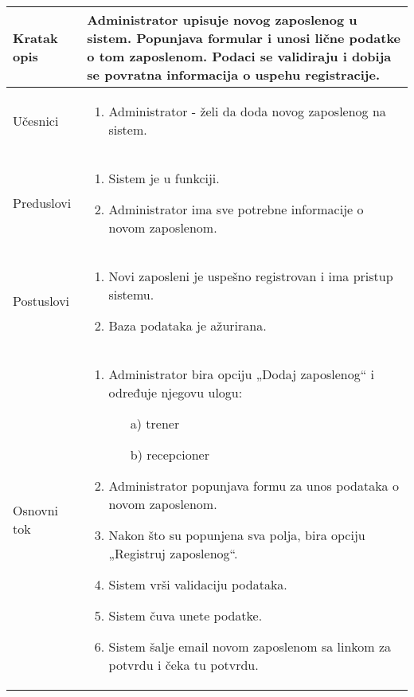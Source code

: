 \documentclass[../main.tex]{subfiles}
\begin{document}
\begin{longtable}{| p{} | p{} |} 

\hline
    Kratak opis &  Administrator upisuje novog zaposlenog u sistem. Popunjava formular i unosi lične podatke o tom zaposlenom. Podaci se validiraju i dobija se povratna informacija o uspehu registracije.\\ 
\hline    
    Učesnici & 
    	\begin{enumerate}
        \item Administrator - želi da doda novog zaposlenog na sistem.
     \end{enumerate}\\
\hline
   Preduslovi & \begin{enumerate}
       \item Sistem je u funkciji.
       \item Administrator ima sve potrebne informacije o novom zaposlenom.
   \end{enumerate}\\
\hline  
    Postuslovi & \begin{enumerate}
        \item Novi zaposleni je uspešno registrovan i ima pristup sistemu.
        \item Baza podataka je ažurirana.
    \end{enumerate}\\
\hline
    Osnovni tok & \begin{enumerate}
        \item Administrator bira opciju „Dodaj zaposlenog“ i određuje njegovu ulogu: 
            \begin{itemize}
                \item[a)] trener
                \item[b)] recepcioner
            \end{itemize}
        \item Administrator popunjava formu za unos podataka o novom zaposlenom.	
        \item Nakon što su popunjena sva polja, bira opciju „Registruj zaposlenog“.
        \item Sistem vrši validaciju podataka.
        \item Sistem čuva unete podatke.
        \item Sistem šalje email novom zaposlenom sa linkom za potvrdu i čeka tu potvrdu.

\end{enumerate}
\end{longtable}
\end{document}
